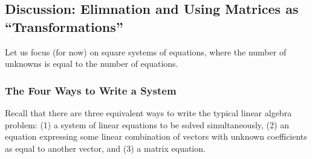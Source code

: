 \documentclass[10pt,]{book}
\theoremstyle{plain}
\theoremstyle{definition}
\numberwithin{equation}{section}
\begin{document}
\subsection[Discussion: Elimnation and Using Matrices as ``Transformations'']{Discussion: Elimnation and Using Matrices as ``Transformations''}\label{subsection-31}

      Let us focus (for now) on square systems of equations, where the number of
      unknowns is equal to the number of equations.
\typeout{************************************************}
\typeout{************************************************}
\subsubsection[The Four Ways to Write a System]{The Four Ways to Write a System}\label{subsubsection-13}

        Recall that there are three equivalent ways to write the typical linear
        algebra problem: (1) a system of linear equations to be solved
        simultaneously, (2) an equation expressing some linear combination of
        vectors with unknown coefficients as equal to another vector, and (3) a
        matrix equation.
\par
\end{document}
